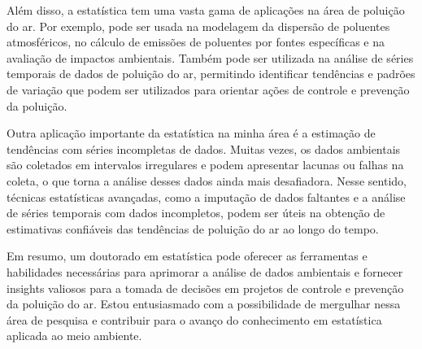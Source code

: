 \documentclass[12pt,a4paper]{article}
\begin{document}
	Além disso, a estatística tem uma vasta gama de aplicações na área de poluição do ar. Por exemplo, pode ser usada na modelagem da dispersão de poluentes atmosféricos, no cálculo de emissões de poluentes por fontes específicas e na avaliação de impactos ambientais. Também pode ser utilizada na análise de séries temporais de dados de poluição do ar, permitindo identificar tendências e padrões de variação que podem ser utilizados para orientar ações de controle e prevenção da poluição.
	
	Outra aplicação importante da estatística na minha área é a estimação de tendências com séries incompletas de dados. Muitas vezes, os dados ambientais são coletados em intervalos irregulares e podem apresentar lacunas ou falhas na coleta, o que torna a análise desses dados ainda mais desafiadora. Nesse sentido, técnicas estatísticas avançadas, como a imputação de dados faltantes e a análise de séries temporais com dados incompletos, podem ser úteis na obtenção de estimativas confiáveis das tendências de poluição do ar ao longo do tempo.
	
	Em resumo, um doutorado em estatística pode oferecer as ferramentas e habilidades necessárias para aprimorar a análise de dados ambientais e fornecer insights valiosos para a tomada de decisões em projetos de controle e prevenção da poluição do ar. Estou entusiasmado com a possibilidade de mergulhar nessa área de pesquisa e contribuir para o avanço do conhecimento em estatística aplicada ao meio ambiente.
	
	\label{LastPage}
\end{document}
